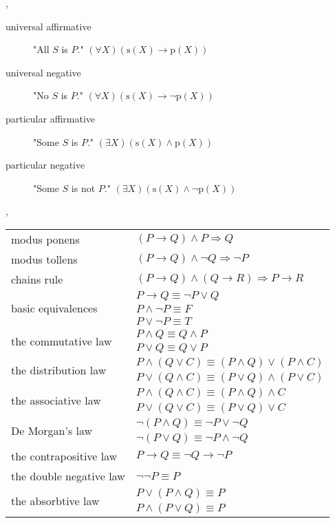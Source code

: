 \documentclass{article}
\begin{document}
	\sep


	\answer

	\begin{description}
		\item[universal affirmative] "All $S$ is $P$." $(\forall X)(\text{s}(X)\rightarrow\text{p}(X))$
		\item[universal negative] "No $S$ is $P$." $(\forall X)(\text{s}(X)\rightarrow\lnot\text{p}(X))$
		\item[particular affirmative] "Some $S$ is $P$." $(\exists X)(\text{s}(X)\land\text{p}(X))$
		\item[particular negative] "Some $S$ is not $P$." $(\exists X)(\text{s}(X)\land\lnot\text{p}(X))$  
	\end{description}

	\sep


	\answer

	\begin{table}[H]
		\centering
		\begin{tabular}{ll}
			\toprule
			modus ponens & $(P\rightarrow Q)\land P\Rightarrow Q$ \\
			modus tollens & $(P\rightarrow Q)\land \lnot Q\Rightarrow \lnot P$ \\
			chains rule & $(P\rightarrow Q)\land(Q\rightarrow R)\Rightarrow P\rightarrow R$ \\
			\midrule
			\multirow{3}{*}{basic equivalences} & $P\rightarrow Q\equiv \lnot P\lor Q$ \\
			& $P\land\lnot P\equiv F$ \\
			& $P\lor \lnot P\equiv T$ \\
			\midrule
			\multirow{2}{*}{the commutative law} & $P\land Q\equiv Q\land P$ \\
			& $P\lor Q\equiv Q\lor P$ \\
			\midrule
			\multirow{2}{*}{the distribution law} & $P\land (Q\lor C)\equiv (P\land Q)\lor(P\land C)$ \\
			& $P\lor (Q\land C)\equiv (P\lor Q)\land(P\lor C)$ \\
			\midrule
			\multirow{2}{*}{the associative law} & $P\land (Q\land C)\equiv(P\land Q)\land C$ \\
			& $P\lor (Q\lor C)\equiv(P\lor Q)\lor C$ \\
			\midrule
			\multirow{2}{*}{De Morgan's law} & $\lnot(P\land Q)\equiv\lnot P\lor\lnot Q$ \\
			& $\lnot(P\lor Q)\equiv\lnot P\land\lnot Q$ \\
			\midrule
			the contrapositive law & $P\rightarrow Q\equiv \lnot Q\rightarrow\lnot P$ \\
			\midrule
			the double negative law & $\lnot\lnot P\equiv P$ \\
			\midrule
			\multirow{2}{*}{the absorbtive law} & $P\lor(P\land Q)\equiv P$ \\
			& $P\land(P\lor Q)\equiv P$ \\
			\toprule
		\end{tabular}
	\end{table}
\end{document}
